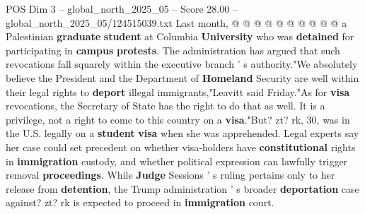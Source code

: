 \begin{textsample}{POS Dim 3 – global\_north\_2025\_05 – Score 28.00 – global\_north\_2025\_05/124515039.txt}
Last month, @ @ @ @ @ @ @ @ @ @ a Palestinian \textbf{graduate} \textbf{student} at Columbia \textbf{University} who was \textbf{detained} for participating in \textbf{campus} \textbf{protests}.
The administration has argued that such revocations fall squarely within the executive branch ' s authority."We absolutely believe the President and the Department of \textbf{Homeland} Security are well within their legal rights to \textbf{deport} illegal immigrants,"Leavitt said Friday."As for \textbf{visa} revocations, the Secretary of State has the right to do that as well.
It is a privilege, not a right to come to this country on a \textbf{visa}."But? zt? rk, 30, was in the U.S. legally on a \textbf{student} \textbf{visa} when she was apprehended.
Legal experts say her case could set precedent on whether visa-holders have \textbf{constitutional} rights in \textbf{immigration} custody, and whether political expression can lawfully trigger removal \textbf{proceedings}.
While \textbf{Judge} Sessions ' s ruling pertains only to her release from \textbf{detention}, the Trump administration ' s broader \textbf{deportation} case against? zt? rk is expected to proceed in \textbf{immigration} court.

\end{textsample}

